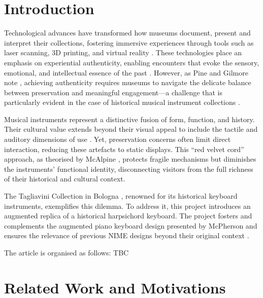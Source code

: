 \section{Introduction}\label{introduction}

Technological advances have transformed how museums document, present and interpret their collections, fostering immersive experiences through tools such as laser scanning, 3D printing, and virtual reality \cite{allard2005use,Wachowiak01082009,RCM_2024_3D,Kuzminsky_LaserScan_2012,Schaich_3D_2007}. These technologies place an emphasis on experiential authenticity, enabling encounters that evoke the sensory, emotional, and intellectual essence of the past \cite{trant_Auth_1999}. However, as Pine and Gilmore note \cite{pinegilmore_2007}, achieving authenticity requires museums to navigate the delicate balance between preservation and meaningful engagement—a challenge that is particularly evident in the case of historical musical instrument collections \cite{McAlpine2014}.

Musical instruments represent a distinctive fusion of form, function, and history. Their cultural value extends beyond their visual appeal to include the tactile and auditory dimensions of use \cite{Fritz2017}. Yet, preservation concerns often limit direct interaction, reducing these artefacts to static displays. This ``red velvet cord'' approach, as theorised by McAlpine \cite{McAlpine2014}, protects fragile mechanisms but diminishes the instruments’ functional identity, disconnecting visitors from the full richness of their historical and cultural context.

The Tagliavini Collection in Bologna \cite{Tagliavini2007}, renowned for its historical keyboard instruments, exemplifies this dilemma. To address it, this project introduces an augmented replica of a historical harpsichord keyboard. 
The project fosters and complements the augmented piano keyboard design presented by McPherson \cite{McPherson2013} and ensures the relevance of previous NIME designs beyond their original context \cite{Masu_NIME_2023}. 


The article is organised as follows: TBC



\section{Related Work and Motivations}\label{related-work}


